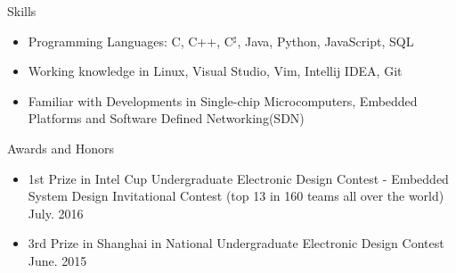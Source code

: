 \documentclass[10pt,oneside]{article}
\newenvironment{ressection}[1]{
	\vspace{4pt}
	{\fontfamily{phv}\selectfont\Large#1}
	\begin{itemize}
	\vspace{3pt}
}{
	\end{itemize}
}
\newcommand{\resitem}[1]{
	\vspace{-4pt}
	\item \begin{flushleft} #1 \end{flushleft}
}
\begin{document}
\begin{ressection}{Skills}

	\resitem{Programming Languages: C, C++, C$^\sharp$, Java, Python, JavaScript, SQL}
	\resitem{Working knowledge in Linux, Visual Studio, Vim, Intellij IDEA, Git}
	\resitem{Familiar with Developments in Single-chip Microcomputers, Embedded Platforms and Software Defined Networking(SDN)}
	
\end{ressection}




\begin{ressection}{Awards and Honors}
	\resitem{1st Prize in Intel Cup Undergraduate Electronic Design Contest - Embedded System Design Invitational Contest (top 13 in 160 teams all over the world) \hfill July. 2016}
	\resitem{3rd Prize in Shanghai in National Undergraduate Electronic Design Contest \hfill {June. 2015}}
\end{ressection}
\end{document}
